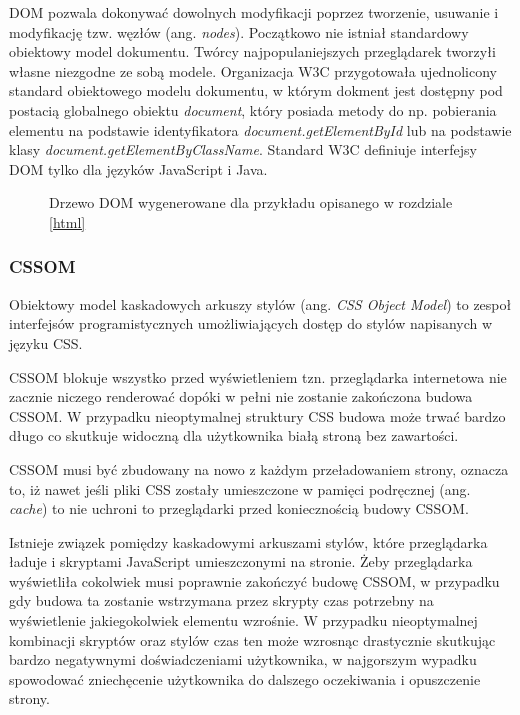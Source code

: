 \documentclass[polish, twoside, 12pt]{mwart}
\begin{document}
DOM pozwala dokonywać dowolnych modyfikacji poprzez tworzenie, usuwanie i modyfikację tzw. węzłów (ang. \emph{nodes}). Początkowo nie istniał standardowy obiektowy model dokumentu. Twórcy najpopulaniejszych przeglądarek tworzyłi własne niezgodne ze sobą modele. Organizacja W3C \cite{w3c} przygotowała ujednolicony standard obiektowego modelu dokumentu, w którym dokment jest dostępny pod postacią globalnego obiektu \emph{document}, który posiada metody do np. pobierania elementu na podstawie identyfikatora \emph{document.getElementById} lub na podstawie klasy \emph{document.getElementByClassName}. Standard W3C definiuje interfejsy DOM tylko dla języków JavaScript i Java.

\begin{figure}
  \centering
  \caption{Drzewo DOM wygenerowane dla przykładu opisanego w rozdziale \ref{html}}
\end{figure}

\subsubsection{CSSOM} \label{cssom}

Obiektowy model kaskadowych arkuszy stylów (ang. \emph{CSS Object Model}) to zespoł interfejsów programistycznych umożliwiających dostęp do stylów napisanych w języku CSS.

CSSOM blokuje wszystko przed wyświetleniem tzn. przeglądarka internetowa nie zacznie niczego renderować dopóki w pełni nie zostanie zakończona budowa CSSOM. W przypadku nieoptymalnej struktury CSS budowa może trwać bardzo długo co skutkuje widoczną dla użytkownika białą stroną bez zawartości.

CSSOM musi być zbudowany na nowo z każdym przeładowaniem strony, oznacza to, iż nawet jeśli pliki CSS zostały umieszczone w pamięci podręcznej (ang. \emph{cache}) to nie uchroni to przeglądarki przed koniecznością budowy CSSOM.

Istnieje związek pomiędzy kaskadowymi arkuszami stylów, które przeglądarka ładuje i skryptami JavaScript umieszczonymi na stronie. Żeby przeglądarka wyświetliła cokolwiek musi poprawnie zakończyć budowę CSSOM, w przypadku gdy budowa ta zostanie wstrzymana przez skrypty czas potrzebny na wyświetlenie jakiegokolwiek elementu wzrośnie. W przypadku nieoptymalnej kombinacji skryptów oraz stylów czas ten może wzrosnąc drastycznie skutkując bardzo negatywnymi doświadczeniami użytkownika, w najgorszym wypadku spowodować zniechęcenie użytkownika do dalszego oczekiwania i opuszczenie strony.
\end{document}
